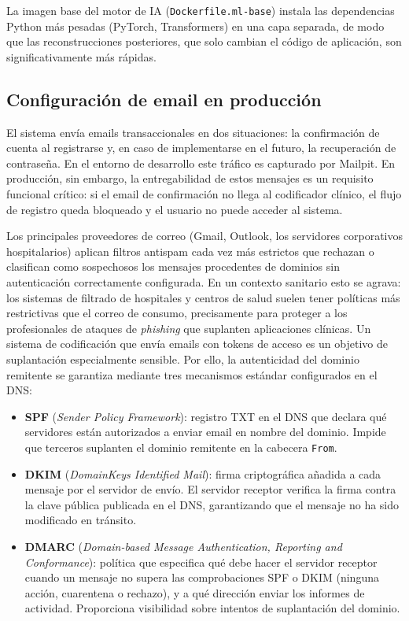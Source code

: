 La imagen base del motor de IA (\texttt{Dockerfile.ml-base}) instala las dependencias Python más pesadas (PyTorch, Transformers) en una capa separada, de modo que las reconstrucciones posteriores, que solo cambian el código de aplicación, son significativamente más rápidas.

\subsection{Configuración de email en producción}

El sistema envía emails transaccionales en dos situaciones: la confirmación de cuenta al registrarse y, en caso de implementarse en el futuro, la recuperación de contraseña. En el entorno de desarrollo este tráfico es capturado por Mailpit. En producción, sin embargo, la entregabilidad de estos mensajes es un requisito funcional crítico: si el email de confirmación no llega al codificador clínico, el flujo de registro queda bloqueado y el usuario no puede acceder al sistema.

Los principales proveedores de correo (Gmail, Outlook, los servidores corporativos hospitalarios) aplican filtros antispam cada vez más estrictos que rechazan o clasifican como sospechosos los mensajes procedentes de dominios sin autenticación correctamente configurada. En un contexto sanitario esto se agrava: los sistemas de filtrado de hospitales y centros de salud suelen tener políticas más restrictivas que el correo de consumo, precisamente para proteger a los profesionales de ataques de \emph{phishing} que suplanten aplicaciones clínicas. Un sistema de codificación que envía emails con tokens de acceso es un objetivo de suplantación especialmente sensible. Por ello, la autenticidad del dominio remitente se garantiza mediante tres mecanismos estándar configurados en el DNS:

\begin{itemize}
 \item \textbf{SPF} (\emph{Sender Policy Framework}): registro TXT en el DNS que declara qué servidores están autorizados a enviar email en nombre del dominio. Impide que terceros suplanten el dominio remitente en la cabecera \texttt{From}.
 \item \textbf{DKIM} (\emph{DomainKeys Identified Mail}): firma criptográfica añadida a cada mensaje por el servidor de envío. El servidor receptor verifica la firma contra la clave pública publicada en el DNS, garantizando que el mensaje no ha sido modificado en tránsito.
 \item \textbf{DMARC} (\emph{Domain-based Message Authentication, Reporting and Conformance}): política que especifica qué debe hacer el servidor receptor cuando un mensaje no supera las comprobaciones SPF o DKIM (ninguna acción, cuarentena o rechazo), y a qué dirección enviar los informes de actividad. Proporciona visibilidad sobre intentos de suplantación del dominio.
\end{itemize}

